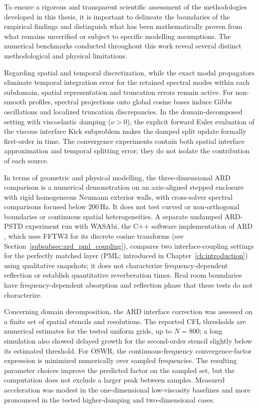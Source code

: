 \documentclass{Configuration_Files/PoliMi3i_thesis}
\newif\ifshowthesischanges
\DeclareRobustCommand{\thesischange}[2]{%
    \ifshowthesischanges
        \textcolor{#1}{#2}%
    \else
        #2%
    \fi
}
\def\thesischange#1#2{#2}%
\begin{document}
\thesischange{red}{To ensure a rigorous and transparent scientific assessment of the methodologies developed in this thesis, it is important to delineate the boundaries of the empirical findings and distinguish what has been mathematically proven from what remains unverified or subject to specific modelling assumptions. The numerical benchmarks conducted throughout this work reveal several distinct methodological and physical limitations.}

\thesischange{red}{Regarding spatial and temporal discretization, while the exact modal propagators eliminate temporal integration error for the retained spectral modes within each subdomain, spatial representation and truncation errors remain active. For non-smooth profiles, spectral projections onto global cosine bases induce Gibbs oscillations and localized truncation discrepancies. In the domain-decomposed setting with viscoelastic damping ($\nu>0$), the explicit forward Euler evaluation of the viscous interface Kick subproblem makes the damped split update formally first-order in time. The convergence experiments contain both spatial interface approximation and temporal splitting error; they do not isolate the contribution of each source.}

\thesischange{red}{In terms of geometric and physical modelling, the three-dimensional ARD comparison is a numerical demonstration on an axis-aligned stepped enclosure with rigid homogeneous Neumann exterior walls, with cross-solver spectral comparisons focused below $200$\,Hz. It does not test curved or non-orthogonal boundaries or continuous spatial heterogeneities. A separate undamped ARD-PSTD experiment run with WASAbi, the C++ software implementation of ARD \citep{wasabi_software_repository}, which uses FFTW3 for its discrete cosine transforms \citep{fftw_user_manual} (see Section~\ref{subsubsec:ard_pml_coupling}), compares two interface-coupling settings for the perfectly matched layer (PML; introduced in Chapter~\ref{ch:introduction}) using qualitative snapshots; it does not characterize frequency-dependent reflection or establish quantitative reverberation times. Real room boundaries have frequency-dependent absorption and reflection phase that these tests do not characterize.}

\thesischange{red}{Concerning domain decomposition, the ARD interface correction was assessed on a finite set of spatial stencils and resolutions. The reported CFL thresholds are numerical estimates for the tested uniform grids, up to $N=800$; a long simulation also showed delayed growth for the second-order stencil slightly below its estimated threshold. For OSWR, the continuous-frequency convergence-factor expression is minimized numerically over sampled frequencies. The resulting parameter choices improve the predicted factor on the sampled set, but the computation does not exclude a larger peak between samples. Measured acceleration was modest in the one-dimensional low-viscosity baselines and more pronounced in the tested higher-damping and two-dimensional cases.}
\end{document}
